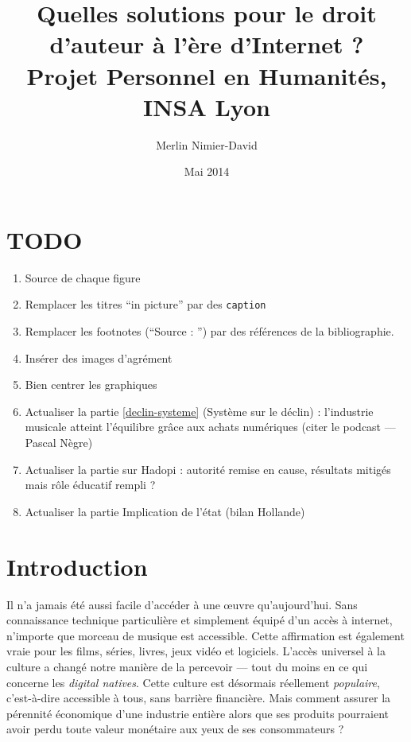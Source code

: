 \documentclass[a4paper]{report}
\title{
	Quelles solutions pour le droit d'auteur à l'ère d'Internet ?\\
	Projet Personnel en Humanités, INSA Lyon
}
\author{Merlin Nimier-David}
\date{Mai 2014}
\begin{document}
	\maketitle

	\tableofcontents

	\chapter{TODO}
	\begin{enumerate}
		\item Source de chaque figure
		\item Remplacer les titres ``in picture'' par des \texttt{caption}
		\item Remplacer les footnotes (``Source : '') par des références de la bibliographie.
		\item Insérer des images d'agrément
		\item Bien centrer les graphiques
		\item Actualiser la partie \ref{declin-systeme} (Système sur le déclin) : l'industrie musicale atteint l'équilibre grâce aux achats numériques (citer le podcast — Pascal Nègre)
		\item Actualiser la partie sur Hadopi : autorité remise en cause, résultats mitigés mais rôle éducatif rempli ?
		\item Actualiser la partie Implication de l'état (bilan Hollande)
	\end{enumerate}


	\chapter{Introduction}
	Il n'a jamais été aussi facile d'accéder à une œuvre qu'aujourd'hui. Sans connaissance technique particulière et simplement équipé d'un accès à internet, n'importe que morceau de musique est accessible. Cette affirmation est également vraie pour les films, séries, livres, jeux vidéo et logiciels. L'accès universel à la culture a changé notre manière de la percevoir — tout du moins en ce qui concerne les \emph{digital natives}. Cette culture est désormais réellement \emph{populaire}, c'est-à-dire accessible à tous, sans barrière financière. Mais comment assurer la pérennité économique d'une industrie entière alors que ses produits pourraient avoir perdu toute valeur monétaire aux yeux de ses consommateurs ?
\end{document}
